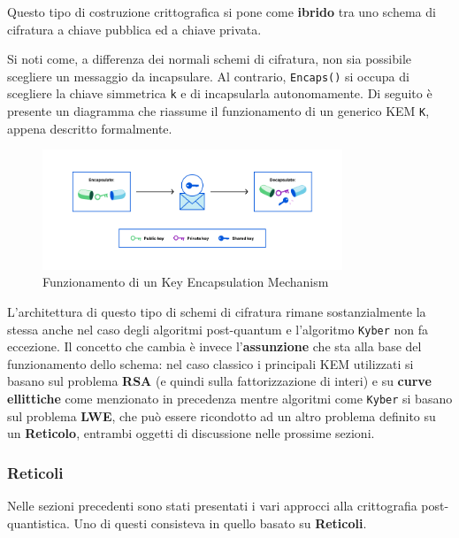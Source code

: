 \documentclass[a4paper, 12pt, oneside]{article}
\theoremstyle{definition}
\begin{document}
Questo tipo di costruzione crittografica si pone come \textbf{ibrido} tra uno schema di cifratura a chiave pubblica ed a chiave privata.

Si noti come, a differenza dei normali schemi di cifratura, non sia possibile scegliere un messaggio da incapsulare. Al contrario, \texttt{Encaps()} si occupa di scegliere la chiave simmetrica \texttt{k} e di incapsularla autonomamente.
\newpage
Di seguito è presente un diagramma che riassume il funzionamento di un generico KEM \texttt{K}, appena descritto formalmente.

\begin{figure}[H]
    \centering
    \includegraphics[width=0.8\textwidth]{images/kem_scheme.png}
    \caption[If you see me then something's very broken]{Funzionamento di un Key Encapsulation Mechanism\protect\footnotemark}
\end{figure}


L'architettura di questo tipo di schemi di cifratura rimane sostanzialmente la stessa anche nel caso degli algoritmi post-quantum e l'algoritmo \texttt{Kyber} non fa eccezione. Il concetto che cambia è invece l'\textbf{assunzione} che sta alla base del funzionamento dello schema: nel caso classico i principali KEM utilizzati si basano sul problema \textbf{RSA} (e quindi sulla fattorizzazione di interi) e su \textbf{curve ellittiche} come menzionato in precedenza mentre algoritmi come \texttt{Kyber} si basano sul problema \textbf{LWE}, che può essere ricondotto ad un altro problema definito su un \textbf{Reticolo}, entrambi oggetti di discussione nelle prossime sezioni.
\newpage
\subsubsection{Reticoli}
Nelle sezioni precedenti sono stati presentati i vari approcci alla crittografia post-quantistica. Uno di questi consisteva in quello basato su \textbf{Reticoli}.
\end{document}

